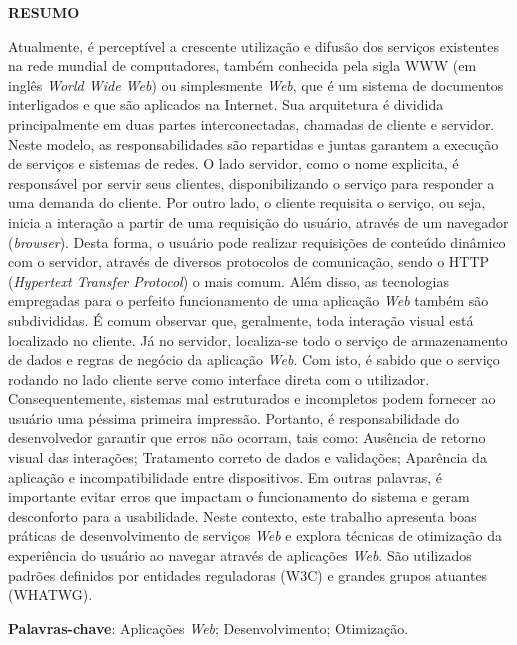 \vfill
\begin{center}
{\textbf{RESUMO}\\}
\end{center}
\noindent

Atualmente, é perceptível a crescente utilização e difusão dos serviços existentes na rede mundial de computadores, também conhecida pela sigla WWW (em inglês \textit{World Wide Web}) ou simplesmente \textit{Web}, que é um sistema de documentos interligados e que são aplicados na Internet. Sua arquitetura é dividida principalmente em duas partes interconectadas, chamadas de cliente e servidor. Neste modelo, as responsabilidades são repartidas e juntas garantem a execução de serviços e sistemas de redes. O lado servidor, como o nome explicita, é responsável por servir seus clientes, disponibilizando o serviço para responder a uma demanda do cliente. Por outro lado, o cliente requisita o serviço, ou seja, inicia a interação a partir de uma requisição do usuário, através de um navegador (\textit{browser}). Desta forma, o usuário pode realizar requisições de conteúdo dinâmico com o servidor, através de diversos protocolos de comunicação, sendo o HTTP (\textit{Hypertext Transfer Protocol}) o mais comum. Além disso, as tecnologias empregadas para o perfeito funcionamento de uma aplicação \textit{Web} também são subdivididas. É comum observar que, geralmente, toda interação visual está localizado no cliente. Já no servidor, localiza-se todo o serviço de armazenamento de dados e regras de negócio da aplicação \textit{Web}. Com isto, é sabido que o serviço rodando no lado cliente serve como interface direta com o utilizador. Consequentemente, sistemas mal estruturados e incompletos podem fornecer ao usuário uma péssima primeira impressão. Portanto, é responsabilidade do desenvolvedor garantir que erros não ocorram, tais como: Ausência de retorno visual das interações; Tratamento correto de dados e validações; Aparência da aplicação e incompatibilidade entre dispositivos. Em outras palavras, é importante evitar erros que impactam o funcionamento do sistema e geram desconforto para a usabilidade. Neste contexto, este trabalho apresenta boas práticas de desenvolvimento de serviços \textit{Web} e explora técnicas de otimização da experiência do usuário ao navegar através de aplicações \textit{Web}. São utilizados padrões definidos por entidades reguladoras (W3C) e grandes grupos atuantes (WHATWG).

\vspace{\onelineskip}
 \noindent
 \textbf{Palavras-chave}: Aplicações \textit{Web}; Desenvolvimento; Otimização.